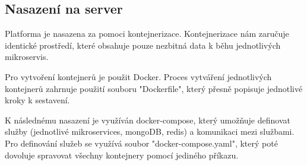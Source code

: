 \subsection{Nasazení na server}
Platforma je nasazena za pomoci kontejnerizace. Kontejnerizace nám zaručuje identické prostředí, které obsahuje pouze nezbitná data k běhu jednotlivých mikroservis.\par
Pro vytvoření kontejnerů je použit Docker. Proces vytváření jednotlivých kontejnerů zahrnuje použití souboru "Dockerfile", který přesně popisuje jednotlivé kroky k sestavení.\par
K následnému nasazení je využíván docker-compose, který umožňuje definovat služby (jednotlivé mikroservices, mongoDB, redis) a komunikaci mezi službami. Pro definování služeb se využívá soubor "docker-compose.yaml", který poté dovoluje spravovat všechny kontejnery pomocí jediného příkazu.
